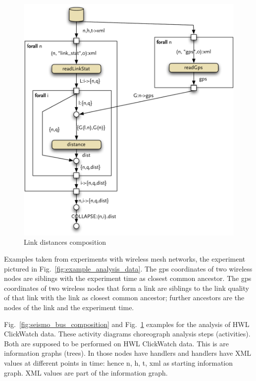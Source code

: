\begin{figure}
\begin{minipage}{0.45\linewidth}
    \includegraphics[width=\linewidth]{figures/link_distances_composition}
    \caption{Link distances composition}%
    \label{fig:link_distances_composition}%
  \end{minipage}
\end{figure}

Examples taken from experiments with wireless mesh networks, the experiment pictured in Fig.~\ref{fig:example_analysis_data}. The gps coordinates of two wireless nodes are siblings with the experiment time as closest common ancestor. The gps coordinates of two wireless nodes that form a link are siblings to the link quality of that link with the link as closest common ancestor; further ancestors are the nodes of the link and the experiment time.

Fig.~\ref{fig:seismo_bus_composition} and Fig.~\ref{fig:link_distances_composition} examples for the analysis of HWL ClickWatch data. These activity diagrams choreograph analysis steps (activities). Both are supposed to be performed on HWL ClickWatch data. This is are information graphs (trees). In those nodes have handlers and handlers have XML values at different points in time: hence n, h, t, xml as starting information graph. XML values are part of the information graph.

